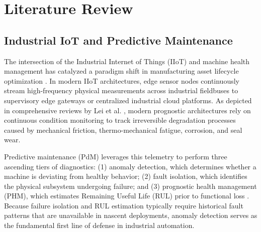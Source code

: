 \documentclass[12pt,a4paper,oneside]{report}
\begin{document}
\chapter{Literature Review}

\section{Industrial IoT and Predictive Maintenance}
The intersection of the Industrial Internet of Things (IIoT) and machine health management has catalyzed a paradigm shift in manufacturing asset lifecycle optimization \cite{zhao2019deep}. In modern IIoT architectures, edge sensor nodes continuously stream high-frequency physical measurements across industrial fieldbuses to supervisory edge gateways or centralized industrial cloud platforms. As depicted in comprehensive reviews by Lei et al. \cite{lei2018machinery}, modern prognostic architectures rely on continuous condition monitoring to track irreversible degradation processes caused by mechanical friction, thermo-mechanical fatigue, corrosion, and seal wear.

Predictive maintenance (PdM) leverages this telemetry to perform three ascending tiers of diagnostics: (1) anomaly detection, which determines whether a machine is deviating from healthy behavior; (2) fault isolation, which identifies the physical subsystem undergoing failure; and (3) prognostic health management (PHM), which estimates Remaining Useful Life (RUL) prior to functional loss \cite{saxena2008damage}. Because failure isolation and RUL estimation typically require historical fault patterns that are unavailable in nascent deployments, anomaly detection serves as the fundamental first line of defense in industrial automation.
\end{document}
